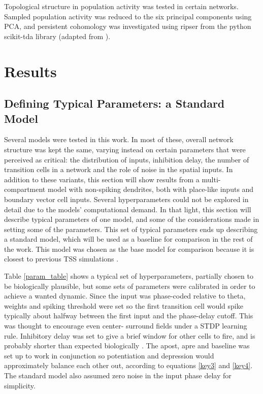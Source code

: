 \documentclass{article}
\begin{document}
    Topological structure in population activity was tested in certain networks. Sampled population activity was reduced to the six principal components using PCA, and persistent cohomology was investigated using ripser from the python scikit-tda library (adapted from \cite{Gardner2022}).

    \newpage
    \section{Results} \label{Results}

    \subsection{Defining Typical Parameters: a Standard Model} \label{Standard model}
    Several models were tested in this work. In most of these, overall network structure was kept the same, varying instead on certain parameters that were perceived as critical: the distribution of inputs, inhibition delay, the number of transition cells in a network and the role of noise in the spatial inputs. In addition to these variants, this section will show results from a multi-compartment model with non-spiking dendrites, both with place-like inputs and boundary vector cell inputs. Several hyperparameters could not be explored in detail due to the models' computational demand. In that light, this section will describe typical parameters of one model, and some of the considerations made in setting some of the parameters. This set of typical parameters ends up describing a standard model, which will be used as a baseline for comparison in the rest of the work. This model was chosen as the base model for comparison because it is closest to previous TSS simulations \parencite{Waniek2017}.

    Table \ref{param_table} shows a typical set of hyperparameters, partially chosen to be biologically plausible, but some sets of parameters were calibrated in order to achieve a wanted dynamic. Since the input was phase-coded relative to theta, weights and spiking threshold were set so the first transition cell would spike typically about halfway between the first input and the phase-delay cutoff. This was thought to encourage even center- surround fields under a STDP learning rule. Inhibitory delay was set to give a brief window for other cells to fire, and is probably shorter than expected biologically \parencite{Buetfering2014}. The apost, apre and baseline was set up to work in conjunction so potentiation and depression would approximately balance each other out, according to equations \ref{key3} and \ref{key4}. The standard model also assumed zero noise in the input phase delay for simplicity.
\end{document}
